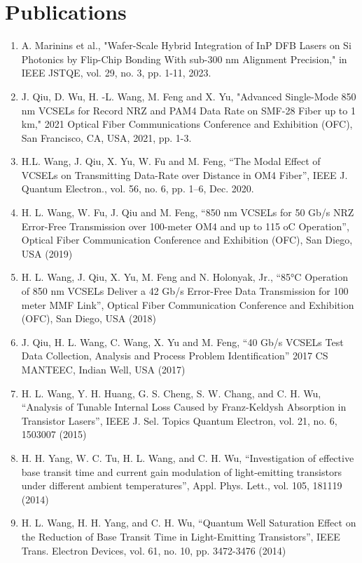 \documentclass[letterpaper,11pt]{article}
\begin{document}

\section{Publications}
\begin{enumerate}

\item A. Marinins et al., "Wafer-Scale Hybrid Integration of InP DFB Lasers on Si Photonics by Flip-Chip Bonding With sub-300 nm Alignment Precision," in IEEE JSTQE, vol. 29, no. 3, pp. 1-11, 2023.
\item J. Qiu, D. Wu, H. -L. Wang, M. Feng and X. Yu, "Advanced Single-Mode 850 nm VCSELs for Record NRZ and PAM4 Data Rate on SMF-28 Fiber up to 1 km," 2021 Optical Fiber Communications Conference and Exhibition (OFC), San Francisco, CA, USA, 2021, pp. 1-3.
\item H.L. Wang, J. Qiu, X. Yu, W. Fu and M. Feng, “The Modal Effect of VCSELs on Transmitting Data-Rate over Distance in OM4 Fiber”, IEEE J. Quantum Electron., vol. 56, no. 6, pp. 1–6, Dec. 2020.  
\item H. L. Wang, W. Fu, J. Qiu and M. Feng, “850 nm VCSELs for 50 Gb/s NRZ Error-Free Transmission over 100-meter OM4 and up to 115 oC Operation”, Optical Fiber Communication Conference and Exhibition (OFC), San Diego, USA (2019)   
\item H. L. Wang, J. Qiu, X. Yu, M. Feng and N. Holonyak, Jr., “85°C Operation of 850 nm VCSELs Deliver a 42 Gb/s Error-Free Data Transmission for 100 meter MMF Link”, Optical Fiber Communication Conference and Exhibition (OFC), San Diego, USA (2018)
\item J. Qiu, H. L. Wang, C. Wang, X. Yu and M. Feng, “40 Gb/s VCSELs Test Data Collection, Analysis and Process Problem Identification” 2017 CS MANTEEC, Indian Well, USA (2017) 
\item H. L. Wang, Y. H. Huang, G. S. Cheng, S. W. Chang, and C. H. Wu, “Analysis of Tunable Internal Loss Caused by Franz-Keldysh Absorption in Transistor Lasers”, IEEE J. Sel. Topics Quantum Electron, vol. 21, no. 6, 1503007 (2015)
\item H. H. Yang, W. C. Tu, H. L. Wang, and C. H. Wu, “Investigation of effective base transit time and current gain modulation of light-emitting transistors under different ambient temperatures”, Appl. Phys. Lett., vol. 105, 181119 (2014)
\item H. L. Wang, H. H. Yang, and C. H. Wu, “Quantum Well Saturation Effect on the Reduction of Base Transit Time in Light-Emitting Transistors”, IEEE Trans. Electron Devices, vol. 61, no. 10, pp. 3472-3476 (2014)

\end{enumerate}
\end{document}
